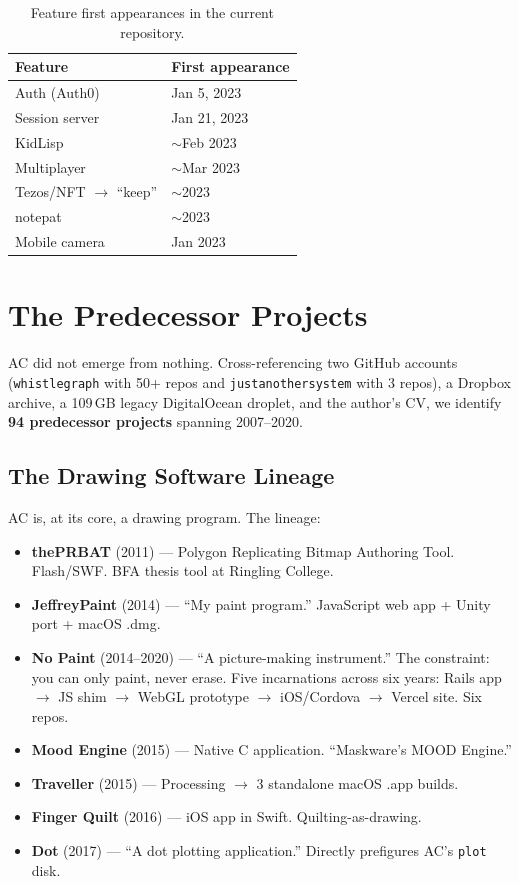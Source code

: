 \documentclass[10pt,letterpaper,twocolumn]{article}
\begin{document}
\begin{table}[h]
\small
\centering
\begin{tabular}{ll}
\toprule
\textbf{Feature} & \textbf{First appearance} \\
\midrule
Auth (Auth0) & Jan 5, 2023 \\
Session server & Jan 21, 2023 \\
KidLisp & $\sim$Feb 2023 \\
Multiplayer & $\sim$Mar 2023 \\
Tezos/NFT $\rightarrow$ ``keep'' & $\sim$2023 \\
notepat & $\sim$2023 \\
Mobile camera & Jan 2023 \\
\bottomrule
\end{tabular}
\caption{Feature first appearances in the current repository.}
\end{table}


\section{The Predecessor Projects}

AC did not emerge from nothing. Cross-referencing two GitHub accounts (\texttt{whistlegraph} with 50+ repos and \texttt{justanothersystem} with 3 repos), a Dropbox archive, a 109\,GB legacy DigitalOcean droplet, and the author's CV, we identify \textbf{94 predecessor projects} spanning 2007--2020.

\subsection{The Drawing Software Lineage}

AC is, at its core, a drawing program. The lineage:

\begin{itemize}
  \item \textbf{thePRBAT} (2011) --- Polygon Replicating Bitmap Authoring Tool. Flash/SWF. BFA thesis tool at Ringling College.
  \item \textbf{JeffreyPaint} (2014) --- ``My paint program.'' JavaScript web app + Unity port + macOS .dmg.
  \item \textbf{No Paint} (2014--2020) --- ``A picture-making instrument.'' The constraint: you can only paint, never erase. Five incarnations across six years: Rails app $\rightarrow$ JS shim $\rightarrow$ WebGL prototype $\rightarrow$ iOS/Cordova $\rightarrow$ Vercel site. Six repos.
  \item \textbf{Mood Engine} (2015) --- Native C application. ``Maskware's MOOD Engine.''
  \item \textbf{Traveller} (2015) --- Processing $\rightarrow$ 3 standalone macOS .app builds.
  \item \textbf{Finger Quilt} (2016) --- iOS app in Swift. Quilting-as-drawing.
  \item \textbf{Dot} (2017) --- ``A dot plotting application.'' Directly prefigures AC's \texttt{plot} disk.
\end{itemize}
\end{document}
